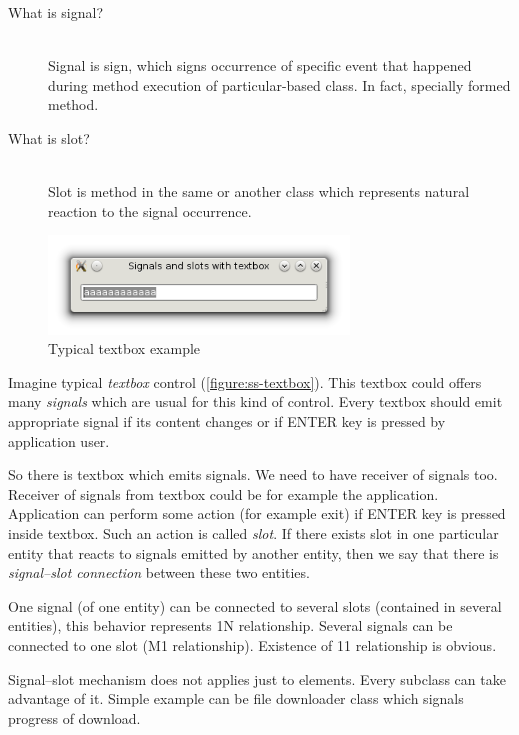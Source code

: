 \begin{description}\label{desc:sig}
\item[What is signal?] \hfill \\
Signal is sign, which signs occurrence of specific event that happened during method execution of particular-based class. In fact, specially formed method.
\item[What is slot?] \hfill \\
Slot is method in the same or another class which represents natural reaction to the signal occurrence.
\end{description}

\begin{figure}[ht]
\centering
\includegraphics[width=8cm]{graphics/laboratory/14-ss-textbox.png}
\caption{Typical textbox example}\label{figure:ss-textbox}
\end{figure}

Imagine typical \textit{textbox} control (\autoref{figure:ss-textbox}). This textbox could offers many \textit{signals} which are usual for this kind of control. Every textbox should emit appropriate signal if its content changes or if ENTER key is pressed by application user.

So there is textbox which emits signals. We need to have receiver of signals too. Receiver of signals from textbox could be for example the application. Application can perform some action (for example exit) if ENTER key is pressed inside textbox. Such an action is called \textit{slot}. If there exists slot in one particular entity that reacts to signals emitted by another entity, then we say that there is \textit{signal--slot connection} between these two entities.

One signal (of one entity) can be connected to several slots (contained in several entities), this behavior represents 1\text{:}N relationship. Several signals can be connected to one slot (M\text{:}1 relationship). Existence of 1\text{:}1 relationship is obvious.

Signal--slot mechanism does not applies just to  elements. Every subclass can take advantage of it. Simple example can be file downloader class which signals progress of download.

